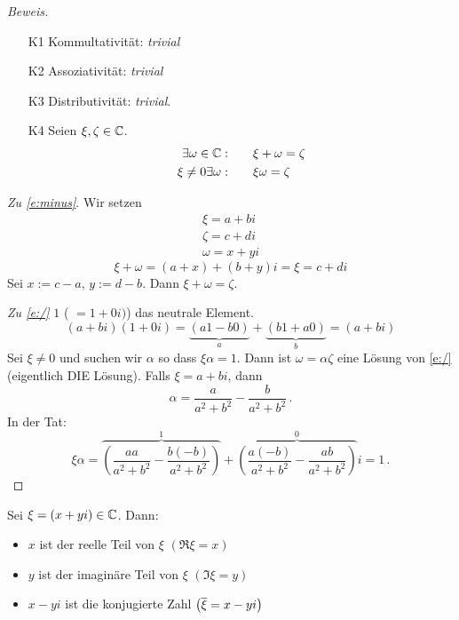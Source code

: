 \begin{proof}[Beweis]
  \begin{itemize}
    \item[K1] Kommultativität: {\em trivial}
    \item[K2] Assoziativität: {\em trivial}
    \item[K3] Distributivität: {\em trivial}.
    \item[K4] Seien $\xi, \zeta \in\mathbb{C}$.
      \begin{align}
        \exists \omega\in\mathbb{C} :&\qquad \xi+\omega=\zeta\label{e:minus}\\
        \xi\neq 0\exists \omega: &\qquad \xi\omega=\zeta\label{e:/}
      \end{align}
  \end{itemize}
{\em Zu \eqref{e:minus}}. Wir setzen
  \begin{eqnarray*}
    \xi=a+bi\\
    \zeta=c+di\\
    \omega=x+yi
  \end{eqnarray*}
  \begin{equation*}
    \xi+\omega = (a+x)+(b+y)i = \xi = c+di
  \end{equation*}
  Sei $x:=c-a$, $y:=d-b$. Dann $\xi+\omega=\zeta$.

\medskip

{\em Zu \eqref{e:/}} $1$ ( $= 1+0i)$) das neutrale Element.
  \begin{equation*}
    (a+bi)(1+0i)=\underbrace{(a1-b0)}_{a}+\underbrace{(b1+a0)}_{b}=(a+bi)
  \end{equation*}
  Sei $\xi\neq 0$ und suchen wir $\alpha$ so dass $\xi\alpha=1$. Dann ist $\omega=\alpha\zeta$ eine Lösung von 
\eqref{e:/} (eigentlich DIE Lösung). Falls $\xi=a+bi$, dann
  \begin{equation*}
    \alpha=\frac{a}{a^2+b^2}-\frac{b}{a^2+b^2}\, .
\end{equation*}
In der Tat:
\begin{equation*}
    \xi\alpha=\overbrace{\left( \frac{aa}{a^2+b^2}-\frac{b(-b)}{a^2+b^2} \right)}^1 + 
    \overbrace{\left( \frac{a(-b)}{a^2+b^2}-\frac{ab}{a^2+b^2} \right)}^0 i=1\, .
\end{equation*}
\end{proof}
\begin{Def}
  Sei $\xi=(x+yi)\in\mathbb{C}$. Dann:
  \begin{itemize}
    \item $x$ ist der reelle Teil von $\xi$ $(\Re\xi=x)$
    \item $y$ ist der imaginäre Teil von $\xi$ $(\Im\xi=y)$
    \item $x-yi$ ist die konjugierte Zahl $\left( \overline{\xi} =x-yi \right)$
  \end{itemize}
\end{Def}
